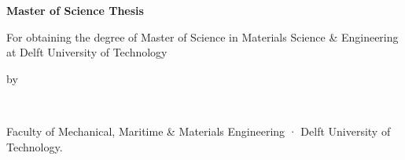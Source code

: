 \begin{titlepage}

\begin{center}

\vspace*{2\bigskipamount}

{\makeatletter
\titlestyle\bfseries\LARGE\@title
\makeatother}

{\makeatletter
\ifx\@subtitle\undefined\else
    \bigskip
    \titlefont\titleshape\Large\@subtitle
\fi
\makeatother}

\end{center}

\cleardoublepage
\thispagestyle{empty}

\begin{center}


\vspace*{2\bigskipamount}

{\makeatletter
\titlestyle\bfseries\LARGE\@title
\makeatother}

{\makeatletter
\ifx\@subtitle\undefined\else
    \bigskip
    \titlefont\titleshape\Large\@subtitle
\fi
\makeatother}

\vfill


{\Large\titlefont\bfseries Master of Science Thesis}

\bigskip
\bigskip

For obtaining the degree of Master of Science in Materials Science \& Engineering at Delft University of Technology

\bigskip
\bigskip

by

\bigskip
\bigskip

\makeatletter
{\Large\titlefont\bfseries\@firstname\ {\titleshape\@lastname}}
\makeatother

\bigskip
\bigskip

Faculty of Mechanical, Maritime \& Materials Engineering · Delft University of Technology.

\vspace*{2\bigskipamount}


\end{center}
\end{titlepage}
